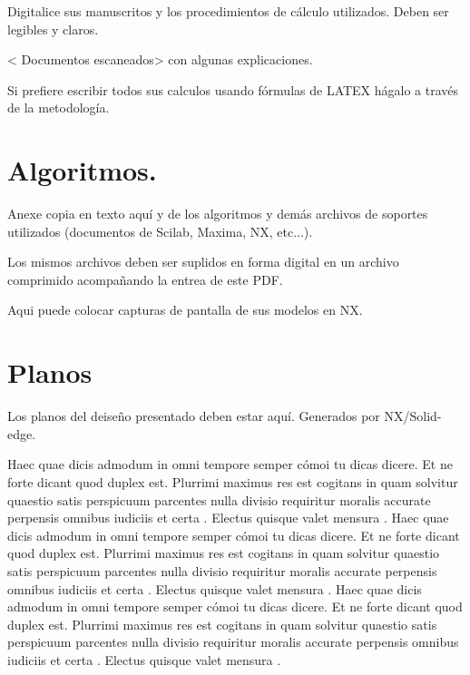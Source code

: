 \documentclass[12pt]{article}
\begin{document}
Digitalice sus manuscritos y los procedimientos de cálculo utilizados. Deben ser legibles y claros.

< Documentos escaneados> con algunas explicaciones.

Si prefiere escribir todos sus calculos usando fórmulas de LATEX hágalo a través de la metodología.

\section{Algoritmos.}

 Anexe copia en texto aquí y  de los algoritmos y demás archivos de soportes utilizados (documentos de Scilab, Maxima, NX, etc...).
 
 Los mismos archivos deben ser suplidos en forma digital en un archivo comprimido acompañando la entrea de este PDF.
 
 Aqui puede colocar capturas de pantalla de sus modelos en NX. 
 
 
 \section{Planos}
Los planos del deiseño presentado deben estar aquí. Generados por NX/Solid-edge.

Haec quae dicis admodum in omni tempore semper cómoi tu dicas dicere. Et ne forte dicant quod duplex est. Plurrimi maximus res est cogitans in quam solvitur quaestio satis perspicuum parcentes nulla divisio requiritur moralis accurate perpensis omnibus iudiciis et certa . Electus quisque valet mensura .
Haec quae dicis admodum in omni tempore semper cómoi tu dicas dicere. Et ne forte dicant quod duplex est. Plurrimi maximus res est cogitans in quam solvitur quaestio satis perspicuum parcentes nulla divisio requiritur moralis accurate perpensis omnibus iudiciis et certa . Electus quisque valet mensura .
Haec quae dicis admodum in omni tempore semper cómoi tu dicas dicere. Et ne forte dicant quod duplex est. Plurrimi maximus res est cogitans in quam solvitur quaestio satis perspicuum parcentes nulla divisio requiritur moralis accurate perpensis omnibus iudiciis et certa . Electus quisque valet mensura .
\end{document}

